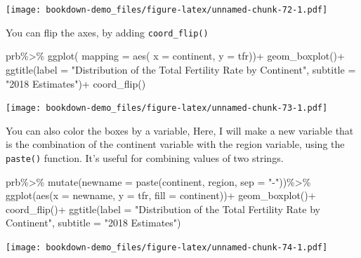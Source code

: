 \documentclass[
]{article}
\newenvironment{Shaded}{\begin{snugshade}}{\end{snugshade}}
\newcommand{\AttributeTok}[1]{\textcolor[rgb]{0.77,0.63,0.00}{#1}}
\newcommand{\FunctionTok}[1]{\textcolor[rgb]{0.00,0.00,0.00}{#1}}
\newcommand{\NormalTok}[1]{#1}
\newcommand{\SpecialCharTok}[1]{\textcolor[rgb]{0.00,0.00,0.00}{#1}}
\newcommand{\StringTok}[1]{\textcolor[rgb]{0.31,0.60,0.02}{#1}}
\begin{document}
\texttt{[image: bookdown-demo\_files/figure-latex/unnamed-chunk-72-1.pdf]}

You can flip the axes, by adding \texttt{coord\_flip()}

\begin{Shaded}
\begin{Highlighting}[]
\NormalTok{prb}\SpecialCharTok{\%\textgreater{}\%}
\FunctionTok{ggplot}\NormalTok{( }\AttributeTok{mapping =} \FunctionTok{aes}\NormalTok{( }\AttributeTok{x =}\NormalTok{ continent,}
                       \AttributeTok{y =}\NormalTok{ tfr))}\SpecialCharTok{+}
  \FunctionTok{geom\_boxplot}\NormalTok{()}\SpecialCharTok{+}
  \FunctionTok{ggtitle}\NormalTok{(}\AttributeTok{label =} \StringTok{"Distribution of the Total Fertility Rate by Continent"}\NormalTok{,}
          \AttributeTok{subtitle =} \StringTok{"2018 Estimates"}\NormalTok{)}\SpecialCharTok{+}
  \FunctionTok{coord\_flip}\NormalTok{()}
\end{Highlighting}
\end{Shaded}

\texttt{[image: bookdown-demo\_files/figure-latex/unnamed-chunk-73-1.pdf]}

You can also color the boxes by a variable, Here, I will make a new
variable that is the combination of the continent variable with the
region variable, using the \texttt{paste()} function. It's useful for combining
values of two strings.

\begin{Shaded}
\begin{Highlighting}[]
\NormalTok{prb}\SpecialCharTok{\%\textgreater{}\%}
  \FunctionTok{mutate}\NormalTok{(}\AttributeTok{newname =} \FunctionTok{paste}\NormalTok{(continent, region, }\AttributeTok{sep =} \StringTok{"{-}"}\NormalTok{))}\SpecialCharTok{\%\textgreater{}\%}
  \FunctionTok{ggplot}\NormalTok{(}\FunctionTok{aes}\NormalTok{(}\AttributeTok{x =}\NormalTok{ newname,}
             \AttributeTok{y =}\NormalTok{ tfr,}
             \AttributeTok{fill =}\NormalTok{ continent))}\SpecialCharTok{+}
  \FunctionTok{geom\_boxplot}\NormalTok{()}\SpecialCharTok{+}
  \FunctionTok{coord\_flip}\NormalTok{()}\SpecialCharTok{+}
  \FunctionTok{ggtitle}\NormalTok{(}\AttributeTok{label =} \StringTok{"Distribution of the Total Fertility Rate by Continent"}\NormalTok{,}
          \AttributeTok{subtitle =} \StringTok{"2018 Estimates"}\NormalTok{)}
\end{Highlighting}
\end{Shaded}

\texttt{[image: bookdown-demo\_files/figure-latex/unnamed-chunk-74-1.pdf]}
\end{document}
